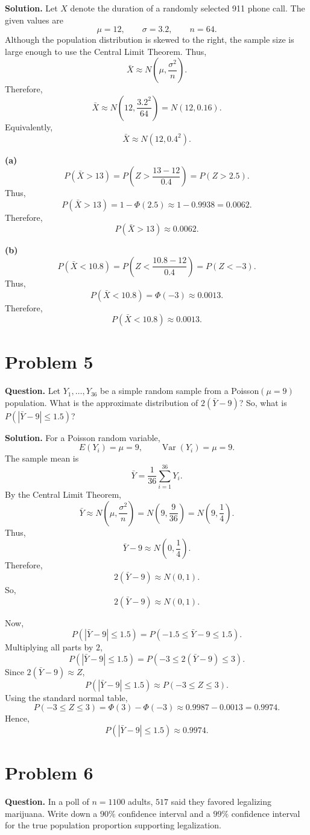 \documentclass[11pt]{article}
\begin{document}
\textbf{Solution.} Let $X$ denote the duration of a randomly selected 911 phone call. The given values are
\[
\mu=12, \qquad \sigma=3.2, \qquad n=64.
\]
Although the population distribution is skewed to the right, the sample size is large enough to use the Central Limit Theorem. Thus,
\[
\bar X\approx N\left(\mu,\frac{\sigma^2}{n}\right).
\]
Therefore,
\[
\bar X\approx N\left(12,\frac{3.2^2}{64}\right)=N(12,0.16).
\]
Equivalently,
\[
\boxed{\bar X\approx N(12,0.4^2)}.
\]

\textbf{(a)}
\[
P(\bar X>13)=P\left(Z>\frac{13-12}{0.4}\right)=P(Z>2.5).
\]
Thus,
\[
P(\bar X>13)=1-\Phi(2.5)\approx 1-0.9938=0.0062.
\]
Therefore,
\[
\boxed{P(\bar X>13)\approx 0.0062}.
\]

\textbf{(b)}
\[
P(\bar X<10.8)=P\left(Z<\frac{10.8-12}{0.4}\right)=P(Z<-3).
\]
Thus,
\[
P(\bar X<10.8)=\Phi(-3)\approx 0.0013.
\]
Therefore,
\[
\boxed{P(\bar X<10.8)\approx 0.0013}.
\]

\newpage
\section*{Problem 5}

\textbf{Question.} Let $Y_1,\ldots,Y_{36}$ be a simple random sample from a Poisson$(\mu=9)$ population. What is the approximate distribution of $2(\bar Y-9)$? So, what is $P(|\bar Y-9|\le 1.5)$?

\textbf{Solution.} For a Poisson random variable,
\[
E(Y_i)=\mu=9, \qquad \operatorname{Var}(Y_i)=\mu=9.
\]
The sample mean is
\[
\bar Y=\frac{1}{36}\sum_{i=1}^{36}Y_i.
\]
By the Central Limit Theorem,
\[
\bar Y\approx N\left(\mu,\frac{\sigma^2}{n}\right)=N\left(9,\frac{9}{36}\right)=N\left(9,\frac14\right).
\]
Thus,
\[
\bar Y-9\approx N\left(0,\frac14\right).
\]
Therefore,
\[
2(\bar Y-9)\approx N(0,1).
\]
So,
\[
\boxed{2(\bar Y-9)\approx N(0,1)}.
\]

Now,
\[
P(|\bar Y-9|\le 1.5)=P(-1.5\le \bar Y-9\le 1.5).
\]
Multiplying all parts by $2$,
\[
P(|\bar Y-9|\le 1.5)=P(-3\le 2(\bar Y-9)\le 3).
\]
Since $2(\bar Y-9)\approx Z$,
\[
P(|\bar Y-9|\le 1.5)\approx P(-3\le Z\le 3).
\]
Using the standard normal table,
\[
P(-3\le Z\le 3)=\Phi(3)-\Phi(-3)\approx 0.9987-0.0013=0.9974.
\]
Hence,
\[
\boxed{P(|\bar Y-9|\le 1.5)\approx 0.9974}.
\]

\newpage
\section*{Problem 6}

\textbf{Question.} In a poll of $n=1100$ adults, $517$ said they favored legalizing marijuana. Write down a $90\%$ confidence interval and a $99\%$ confidence interval for the true population proportion supporting legalization.
\end{document}
